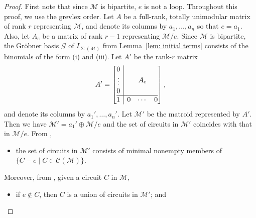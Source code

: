 \documentclass{amsart}
\numberwithin{equation}{section}
\theoremstyle{plain}
\theoremstyle{definition}
\newcommand{\calC}{\mathcal{C}}
\newcommand{\grob}{\mathscr{G}}
\newcommand{\calM}{\mathcal{M}}
\DeclareMathOperator{\SEP}{\Sigma}
\begin{document}
\begin{proof}
First note that since $\calM$ is bipartite, $e$ is not a loop.
     Throughout this proof, we use the grevlex  order.
     Let $A$ be a full-rank, totally unimodular matrix of rank $r$ representing $\calM$, and denote its columns by $a_1,\dots,a_n$ so that $e = a_1$.
     Also, let $A_e$ be a matrix of rank $r-1$ representing $\calM/e$.
     Since $\calM$ is bipartite, the Gr\"obner basis $\grob$ of $I_{\SEP(\calM)}$ from Lemma~\ref{lem: initial terms} consists of the binomials of the form (i) and (iii).
     Let $A'$ be the rank-{$r$} matrix
     \[
    A' = \left[\begin{array}{@{}c|c@{}}
            \begin{matrix} 0 \\
            \vdots \\ 0 \end{matrix} & A_e\\
            \hline
            1 & \begin{matrix} 0 & \cdots & 0 \end{matrix} 
        \end{array}\right],
    \]
   and denote its columns by $a_1',\dots,a_n'$. Let $\calM'$ be the matroid represented by $A'$.
Then we have $\calM' = a_1'  \oplus \calM /e$ and 
the set of circuits in $\calM'$ coincides with that in $\calM/e$. 
From \cite[Proposition~3.1.10]{Oxley},
\begin{itemize}
    \item[(a)]
    the set of circuits in $\calM'$ consists of minimal nonempty members of 
$\{ C - e \mid C \in \calC(\calM)\}$.
\end{itemize}
Moreover, from \cite[Exercise 3.1.2]{Oxley}, given a circuit $C$ in $\calM$,
\begin{itemize}
    \item[(b)]
    if $e \notin C$, then $C$ is a union of circuits in $\calM'$; and

\end{itemize}
\end{proof}
\end{document}
